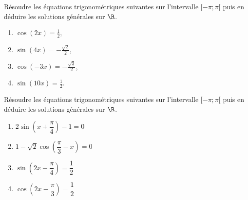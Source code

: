 \documentclass[11pt]{article}
\begin{document}
\begin{exercice}
Résoudre les équations trigonométriques suivantes sur l'intervalle
\([-\pi ; \pi[\) puis en déduire les solutions générales sur $\R$.
\begin{multicols}{2}
\begin{enumerate}
    \item \(\cos(2x) = \frac{1}{2}\),
    \item \(\sin(4x) = -\frac{\sqrt{2}}{2}\),
    \item \(\cos(-3x) = -\frac{\sqrt{3}}{2}\),
    \item \(\sin(10x) = \frac{1}{2}\).
\end{enumerate}
\end{multicols}
\end{exercice}

\begin{exercice}
Résoudre les équations trigonométriques suivantes sur l'intervalle
\([-\pi ; \pi[\) puis en déduire les solutions générales sur $\R$.
\begin{multicols}{2}
\begin{enumerate}
    \item $2 \sin \left( x + \dfrac{\pi}{4} \right) - 1 = 0$
    \item $1 - \sqrt{2} \cos \left(  \dfrac{\pi}{3}-x \right) = 0$
    \item $\sin\left( 2x-\dfrac{\pi}{4}\right) = \dfrac{1}{2}$
    \item $\cos\left( 2x-\dfrac{\pi}{3}\right)  = \dfrac{1}{2}$
\end{enumerate}
\end{multicols}
\end{exercice}
\end{document}
